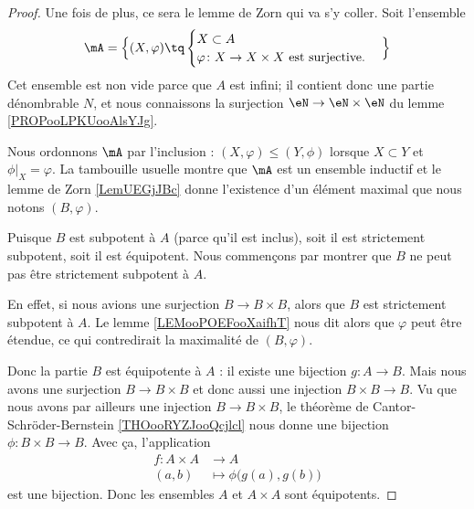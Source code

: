 \begin{proof}
	Une fois de plus, ce sera le lemme de Zorn qui va s'y coller. Soit l'ensemble
	\begin{equation}
		\mA=\Big\{  (X,\varphi)  \tq
		\begin{cases}
			X\subset A \\
			\varphi\colon X\to X\times X\text{ est surjective.}
		\end{cases}
		\Big\}
	\end{equation}
	Cet ensemble est non vide parce que \( A\) est infini; il contient donc une partie dénombrable \( N\), et nous connaissons la surjection \( \eN\to \eN\times \eN\) du lemme \ref{PROPooLPKUooAlsYJg}.

	Nous ordonnons \( \mA\) par l'inclusion : \( (X,\varphi)\leq (Y,\phi)\) lorsque \( X\subset Y\) et \( \phi|_X=\varphi\). La tambouille usuelle montre que \( \mA\) est un ensemble inductif et le lemme de Zorn \ref{LemUEGjJBc} donne l'existence d'un élément maximal que nous notons \( (B,\varphi)\).

	Puisque \( B\) est subpotent à \( A\) (parce qu'il est inclus), soit il est strictement subpotent, soit il est équipotent. Nous commençons par montrer que \( B\) ne peut pas être strictement subpotent à \( A\).

	En effet, si nous avions une surjection \( B\to B\times B\), alors que \( B\) est strictement subpotent à \( A\). Le lemme \ref{LEMooPOEFooXaifhT} nous dit alors que \( \varphi\) peut être étendue, ce qui contredirait la maximalité de \( (B,\varphi)\).

	Donc la partie \( B\) est équipotente à \( A\) : il existe une bijection \( g\colon A\to B\). Mais nous avons une surjection \( B\to B\times B\) et donc aussi une injection \( B\times B\to B\). Vu que nous avons par ailleurs une injection \( B\to B\times B\), le théorème de Cantor-Schröder-Bernstein \ref{THOooRYZJooQcjlcl} nous donne une bijection \( \phi\colon B\times B\to B\). Avec ça, l'application
	\begin{equation}
		\begin{aligned}
			f\colon A\times A & \to A                             \\
			(a,b)             & \mapsto \phi\big( g(a),g(b) \big)
		\end{aligned}
	\end{equation}
	est une bijection. Donc les ensembles \( A\) et \( A\times A\) sont équipotents.
\end{proof}

